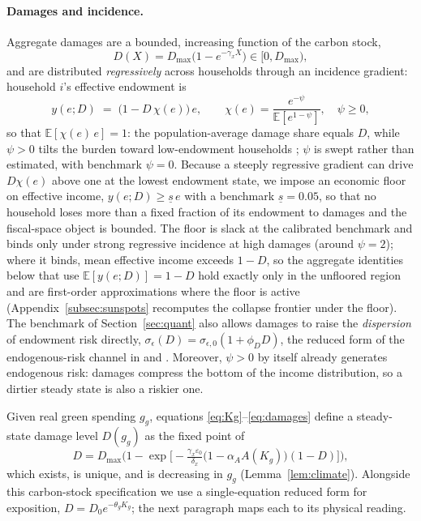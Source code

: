 \documentclass[12pt]{article}
\newcommand{\E}{\mathbb{E}}
\begin{document}
\paragraph{Damages and incidence.} Aggregate damages are a bounded, increasing
function of the carbon stock,
\begin{equation}
D(X) = D_{\max}\big(1-e^{-\gamma_x X}\big)\in[0,D_{\max}),
\label{eq:damages}
\end{equation}
and are distributed \emph{regressively} across households through an incidence
gradient: household $i$'s effective endowment is
\begin{equation}
y(e;D) \;=\; \big(1 - D\,\chi(e)\big)\,e, \qquad
\chi(e) = \frac{e^{-\psi}}{\E\!\left[e^{1-\psi}\right]},\quad \psi\ge0,
\label{eq:incidence}
\end{equation}
so that $\E[\chi(e)\,e]=1$: the population-average damage share equals $D$,
while $\psi>0$ tilts the burden toward low-endowment households
\citep[an assumption motivated by, but not identified from, the
carbon-pricing incidence evidence in][]{kanzig2023carbon,fried2018};
$\psi$ is swept rather than estimated, with benchmark $\psi=0$. Because a
steeply regressive gradient can drive $D\chi(e)$ above one at the lowest
endowment state, we impose an economic floor on effective income,
$y(e;D)\ge\underline{s}\,e$ with a benchmark $\underline{s}=0.05$, so that no
household loses more than a fixed fraction of its endowment to damages and
the fiscal-space object is bounded. The floor is slack at the calibrated
benchmark and binds only under strong regressive incidence at high damages
(around $\psi=2$); where it binds, mean effective income exceeds $1-D$, so
the aggregate identities below that use $\E[y(e;D)]=1-D$ hold exactly only
in the unfloored region and are first-order approximations where the floor
is active (Appendix~\ref{subsec:sunspots} recomputes the collapse frontier
under the floor). The
benchmark of Section~\ref{sec:quant} also allows damages to raise the
\emph{dispersion} of endowment risk directly,
$\sigma_\epsilon(D)=\sigma_{\epsilon,0}(1+\phi_D D)$, the reduced form of the
endogenous-risk channel in \citet{acharya2023optimal} and
\citet{acharyabenhabib2024}. Moreover, $\psi>0$ by itself already generates
endogenous risk: damages compress the bottom of the income distribution, so a
dirtier steady state is also a riskier one.

Given real green spending $g_g$, equations
\eqref{eq:Kg}--\eqref{eq:damages} define a steady-state damage level
$D(g_g)$ as the fixed point of
\begin{equation}
D = D_{\max}\Big(1 - \exp\Big[-\tfrac{\gamma_x \varepsilon_0}{\delta_x}
\big(1-\alpha_A A(K_g)\big)(1-D)\Big]\Big),
\label{eq:climatefixedpoint}
\end{equation}
which exists, is unique, and is decreasing in $g_g$
(Lemma~\ref{lem:climate}). Alongside this carbon-stock specification we use
a single-equation reduced form for exposition, $D = D_0 e^{-\theta_g K_g}$;
the next paragraph maps each to its physical reading.
\end{document}
